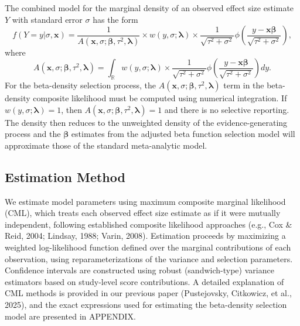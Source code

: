 \documentclass[
  american,
  man, donotrepeattitle,floatsintext]{apa7}
\begin{document}
The combined model for the marginal density of an observed effect size estimate \(Y\) with standard error \(\sigma\) has the form
\begin{equation}
\label{eq:generic-selection}
f(Y = y | \sigma, \mathbf{x}) = \frac{1}{A(\mathbf{x}, \sigma; \boldsymbol\beta, \tau^2, \boldsymbol\lambda)} \times w\left(y, \sigma; \boldsymbol\lambda \right) \times \frac{1}{\sqrt{\tau^2 + \sigma^2}} \phi\left(\frac{y - \mathbf{x} \boldsymbol\beta}{\sqrt{\tau^2 + \sigma^2}}\right),
\end{equation}
where
\begin{equation}
\label{eq:generic-selection-A}
A(\mathbf{x}, \sigma; \boldsymbol\beta, \tau^2, \boldsymbol\lambda) =  \int_\mathbb{R} w\left(y, \sigma; \boldsymbol\lambda \right) \times  \frac{1}{\sqrt{\tau^2 + \sigma^2}}\phi\left(\frac{y - \mathbf{x}\boldsymbol\beta}{\sqrt{\tau^2 + \sigma^2}}\right) dy.
\end{equation}
For the beta-density selection process, the \(A(\mathbf{x}, \sigma; \boldsymbol\beta, \tau^2, \boldsymbol\lambda)\) term in the beta-density composite likelihood must be computed using numerical integration.
If \(w(y, \sigma; \boldsymbol\lambda) = 1\), then \(A(\mathbf{x}, \sigma; \boldsymbol\beta, \tau^2, \boldsymbol\lambda) = 1\) and there is no selective reporting. The density then reduces to the unweighted density of the evidence-generating process and the \(\boldsymbol\beta\) estimates from the adjusted beta function selection model will approximate those of the standard meta-analytic model.

\subsection{Estimation Method}\label{estimation-method}

We estimate model parameters using maximum composite marginal likelihood (CML), which treats each observed effect size estimate as if it were mutually independent, following established composite likelihood approaches (e.g., Cox \& Reid, 2004; Lindsay, 1988; Varin, 2008). Estimation proceeds by maximizing a weighted log-likelihood function defined over the marginal contributions of each observation, using reparameterizations of the variance and selection parameters. Confidence intervals are constructed using robust (sandwich-type) variance estimators based on study-level score contributions. A detailed explanation of CML methods is provided in our previous paper (Pustejovsky, Citkowicz, et al., 2025), and the exact expressions used for estimating the beta-density selection model are presented in APPENDIX.
\end{document}
